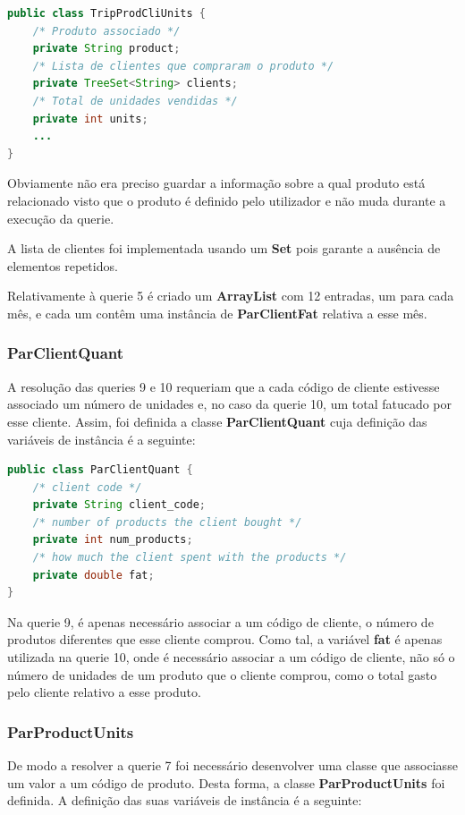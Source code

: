 \documentclass[10pt] {article}
\begin{document}
\begin{lstlisting}[language=Java]
public class TripProdCliUnits {
	/* Produto associado */
	private String product;
	/* Lista de clientes que compraram o produto */
	private TreeSet<String> clients;
	/* Total de unidades vendidas */
	private int units;
	...
}
\end{lstlisting}

\par Obviamente não era preciso guardar a informação sobre a qual produto está relacionado visto que o produto é definido
pelo utilizador e não muda durante a execução da querie.
\par A lista de clientes foi implementada usando um \textbf{Set} pois garante a ausência de elementos repetidos.
\par Relativamente à querie 5 é criado um \textbf{ArrayList} com 12 entradas, um para cada mês, e cada um contêm uma
instância de \textbf{ParClientFat} relativa a esse mês.

\subsubsection{ParClientQuant}
\par A resolução das queries 9 e 10 requeriam que a cada código de cliente estivesse associado um número de unidades e,
no caso da querie 10, um total fatucado por esse cliente. Assim, foi definida a classe \textbf{ParClientQuant} cuja
definição das variáveis de instância é a seguinte:

\begin{lstlisting}[language=Java]
public class ParClientQuant {
    /* client code */
	private String client_code;
	/* number of products the client bought */
    private int num_products;
    /* how much the client spent with the products */
    private double fat;
}
\end{lstlisting}

\par Na querie 9, é apenas necessário associar a um código de cliente, o número de produtos diferentes que esse cliente
comprou. Como tal, a variável \textbf{fat} é apenas utilizada na querie 10, onde é necessário associar a um código de
cliente, não só o número de unidades de um produto que o cliente comprou, como o total gasto pelo cliente relativo a esse
produto.

\subsubsection{ParProductUnits}
\par De modo a resolver a querie 7 foi necessário desenvolver uma classe que associasse um valor a um código de produto.
Desta forma, a classe \textbf{ParProductUnits} foi definida. A definição das suas variáveis de instância é a seguinte:
\end{document}
